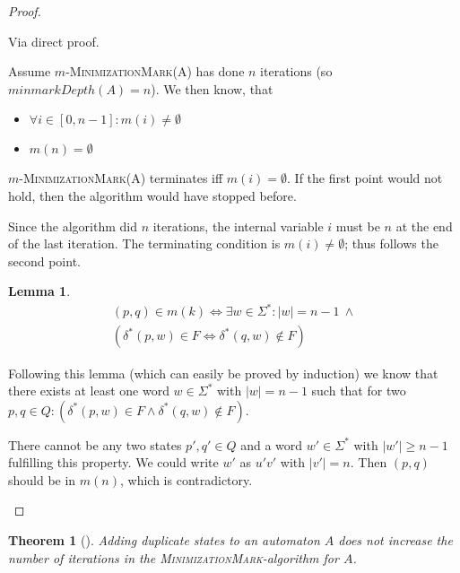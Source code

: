 \documentclass[a4paper, oneside, 11pt]{report}
\newtheorem{theorem}{Theorem}
\newtheorem{lemma}{Lemma}
\theoremstyle{definition}
\theoremstyle{remark}
\newcommand{\MinMark}{\textsc{MinimizationMark}}
\begin{document}
\begin{proof}
	\begin{description}
		\item
		
		Via direct proof.
		
		Assume $m$-\MinMark(A) has done $n$ iterations (so $minmarkDepth(A) = n$). We then know, that
		\begin{itemize}
			\item $\forall i \in [0,n-1]\colon m(i) \neq \emptyset$
			\item $m(n)= \emptyset$
		\end{itemize}
		$m$-\MinMark(A) terminates iff $m(i) = \emptyset$. If the first point would not hold, then the algorithm would have stopped before.
		
		Since the algorithm did $n$ iterations, the internal variable $i$ must be $n$ at the end of the last iteration. The terminating condition is $m(i) \neq \emptyset$; thus follows the second point.
		
		\begin{lemma}
			\begin{multline*}
			(p,q) \in m(k) \Longleftrightarrow 
			\exists w\in\Sigma^*\colon |w| = n - 1\ \land \\
			(\delta^*(p,w) \in F \Leftrightarrow \delta^*(q,w) \notin F)
			\end{multline*}
		\end{lemma}
		
		Following this lemma (which can easily be proved by induction) we know that there exists at least one word $w\in\Sigma^*$ with $|w| = n-1$ such that for two $p,q \in Q\colon (\delta^*(p,w) \in F \land \delta^*(q,w) \notin F)$.
		
		There cannot be any two states $p',q'\in Q$ and a word $w'\in\Sigma^*$ with $|w'| \ge n-1$ fulfilling this property. We could write $w'$ as $u'v'$ with $|v'| = n$. Then $(p,q)$ should be in $m(n)$, which is contradictory.
	\end{description}
\end{proof}

\begin{theorem}[]
	Adding duplicate states to an automaton $A$ does not increase the number of iterations in the \MinMark-algorithm for $A$.
\end{theorem}
\end{document}
